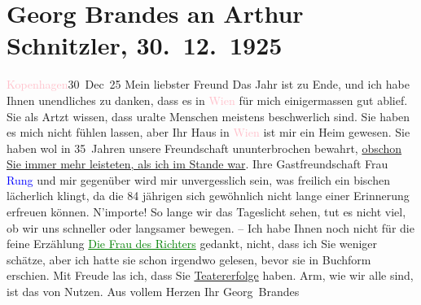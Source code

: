 

               \section[Georg Brandes an Arthur Schnitzler, 30. 12. 1925]{ Georg Brandes an Arthur Schnitzler, 30. 12. 1925}\nopagebreak{}\rehead{ }\normalsize\beginnumbering{} \toendnotes[C]{\smallbreak\pagebreak[2]} 
\pstart
           \raggedleft{}{\pb}\textcolor{pink}{Kopenhagen}{}\ledrightnote{\textcolor{pink}{Kopenhagen}}{ }30 Dec 25\pend
           \pstart{}Mein liebster Freund\pend\pstart
           Das Jahr ist zu Ende, und ich habe Ihnen unendliches zu danken, dass es in \textcolor{pink}{Wien}{}\ledrightnote{\textcolor{pink}{Wien}} für mich einigermassen gut ablief. Sie als
                    Artzt wissen, dass uralte Menschen meistens beschwerlich sind. Sie haben es mich
                    nicht fühlen lassen, aber Ihr Haus in \textcolor{pink}{Wien}{}\ledrightnote{\textcolor{pink}{Wien}} ist
                    mir ein Heim gewesen. Sie haben wol in 35 Jahren unsere Freundschaft
                    ununterbrochen bewahrt, \uline{obschon Sie immer mehr
                        leisteten, als ich im Stande war}. Ihre Gastfreundschaft Frau \textcolor{blue}{Rung}{}\ledrightnote{\textcolor{blue}{Gertrud Rung}} und mir {\pb}gegenüber wird mir
                    unvergesslich sein, was freilich ein bischen lächerlich klingt, da die 84
                    jährigen sich gewöhnlich nicht lange einer Erinnerung erfreuen können.\pend
           \pstart
           N’importe! So lange wir das Tageslicht sehen, tut es nicht viel, ob wir uns
                    schneller oder langsamer bewegen. – Ich habe Ihnen noch nicht für die feine
                    Erzählung \textcolor{green}{\uline{Die Frau des Richters}}{}\ledrightnote{\textcolor{green}{Die Frau des Richters. Novelle}} gedankt, nicht, dass ich Sie weniger schätze, aber ich hatte sie schon
                    irgendwo gelesen, bevor sie in Buchform erschien. Mit Freude las ich, dass Sie
                        \uline{Teatererfolge} haben. Arm, wie wir alle sind,
                    ist das von Nutzen. Aus vollem Herzen\pend
           \pstart Ihr \spacefill\mbox{Georg Brandes}\pend{}\endnumbering{}  
      